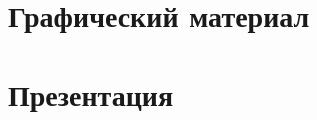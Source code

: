 \appendix
\renewcommand{\thesection}{Приложение \Asbuk{section}}
\newcommand{\appsec}{\newpage\section{}\setcounter{equation}{0}}
\appsec
\section*{Графический материал}



%
%
%
%
%
%



%
%
%
%
%
%
%
%


\newpage
\appsec
\section*{Презентация}








